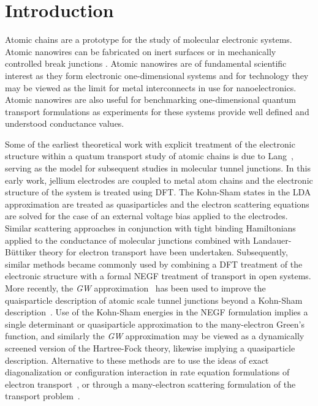 \section{Introduction}

Atomic chains are a prototype for the study of
molecular electronic systems. Atomic nanowires can be fabricated on
inert surfaces \cite{segovia1999nature,nilius2002science} or in
mechanically controlled break junctions \cite{vanruitenbeek1998mcbj}.
Atomic nanowires are of fundamental scientific interest as they form
electronic one-dimensional systems and for technology they may be viewed
as the limit for metal interconnects in use for nanoelectronics.  Atomic
nanowires are also useful for benchmarking one-dimensional quantum
transport formulations as experiments for these systems provide well
defined and understood conductance values.

Some of the earliest theoretical work with explicit treatment of the
electronic structure within a quatum transport study of atomic chains is
due to Lang~\cite{Lang1995prb}, serving as the model for subsequent
studies in molecular tunnel junctions. In this early work, jellium
electrodes are coupled to metal atom chains and the electronic structure
of the system is treated using \ac{DFT}. The Kohn-Sham states in the
\ac{LDA} approximation are treated as quasiparticles and the electron
scattering equations are solved for the case of an external voltage bias
applied to the electrodes. Similar scattering approaches in conjunction
with tight binding Hamiltonians applied to the conductance of molecular
junctions combined with Landauer-B\"uttiker theory for electron transport
\cite{emberlykirczenow1999standingwave,
emberlykirczenow2000molecularwire} have been undertaken. 
Subsequently, similar methods became commonly used by combining a 
\ac{DFT} treatment of the electronic structure with a formal \ac{NEGF}
treatment of transport in open systems. More recently, the {\it GW}
approximation~\cite{hedin1965gw} has been used to improve  the
quaisparticle description of atomic scale tunnel junctions beyond a Kohn-Sham
description~\cite{thygesen_rubio,neaton2007amines}.  Use of the
Kohn-Sham energies in the NEGF formulation implies a single determinant
or quasiparticle approximation to the many-electron Green's function,
and similarly the {\it GW} approximation may be viewed as a dynamically
screened version of the Hartree-Fock theory, likewise implying a
quasiparticle description. Alternative to these methods are to use the
ideas of exact diagonalization or configuration interaction in rate
equation formulations of electron
transport~\cite{pedersen_many_body_tunneling}, or through a many-electron
scattering formulation of the transport problem~\cite{vici2004,greer2011}. 

